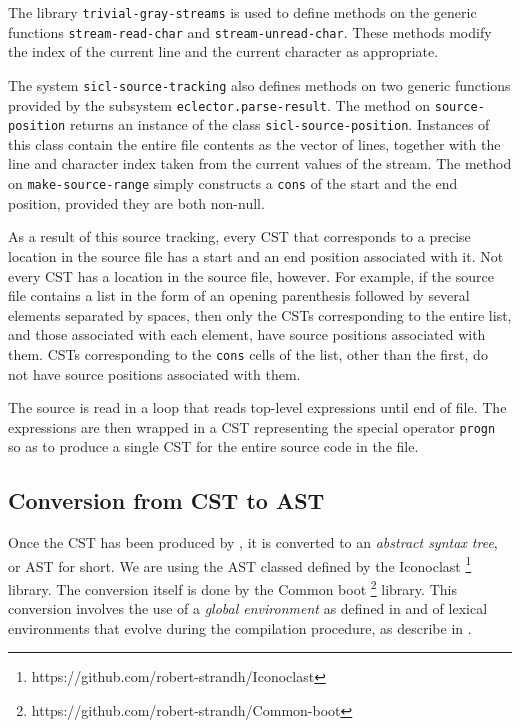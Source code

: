 The library \texttt{trivial-gray-streams} is used to define methods on
the generic functions \texttt{stream-read-char} and
\texttt{stream-unread-char}.  These methods modify the index of the
current line and the current character as appropriate.

The system \texttt{sicl-source-tracking} also defines methods on two
generic functions provided by the \eclector{} subsystem
\texttt{eclector.parse-result}.  The method on
\texttt{source-position} returns an instance of the class
\texttt{sicl-source-position}.  Instances of this class contain the
entire file contents as the vector of lines, together with the line
and character index taken from the current values of the stream.  The
method on \texttt{make-source-range} simply constructs a \texttt{cons}
of the start and the end position, provided they are both non-null.

As a result of this source tracking, every CST that corresponds to a
precise location in the source file has a start and an end position
associated with it.  Not every CST has a location in the source file,
however.  For example, if the source file contains a list in the form
of an opening parenthesis followed by several elements separated by
spaces, then only the CSTs corresponding to the entire list, and those
associated with each element, have source positions associated with
them.  CSTs corresponding to the \texttt{cons} cells of the list,
other than the first, do not have source positions associated with
them.

The source is read in a loop that reads top-level expressions until
end of file.  The expressions are then wrapped in a CST representing
the special operator \texttt{progn} so as to produce a single CST for
the entire source code in the file.

\subsection{Conversion from CST to AST}

Once the CST has been produced by \eclector{}, it is converted to an
\emph{abstract syntax tree}, or AST for short.  We are using the AST
classed defined by the Iconoclast%
\footnote{https://github.com/robert-strandh/Iconoclast}
library.  The conversion itself is done by the Common boot%
\footnote{https://github.com/robert-strandh/Common-boot}
library.  This conversion involves the use of a \emph{global
  environment} as defined in
 and of lexical
environments that evolve during the compilation procedure, as describe
in .

